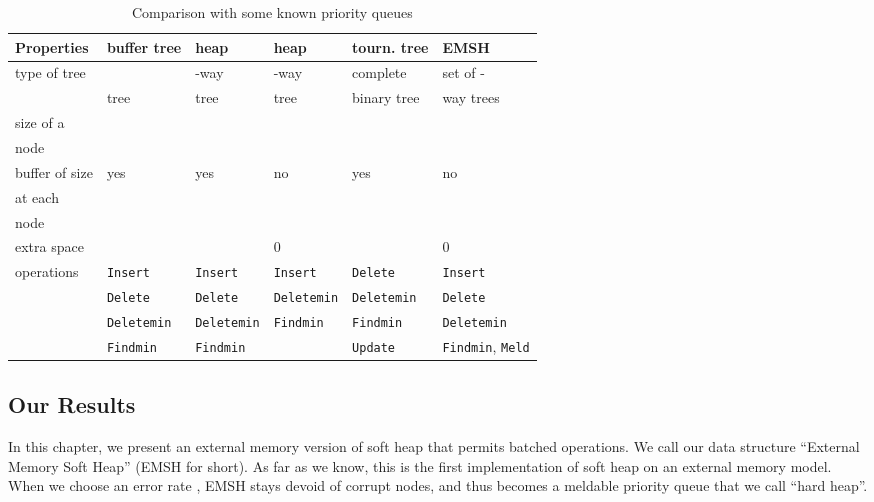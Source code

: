 \begin{table}
\begin{center}
            \begin{tabular}{|l|l|l|l|l|l|}
\cline{1-6}
               \hline
{\bf Properties}  &   {\bf buffer tree}     & {\bf heap} \cite{KS96}      & {\bf heap} \cite{FJKT99}    & {\bf tourn. tree}
   & {\bf EMSH} \\
\hline \hline
type of tree &     & -way & -way & complete & set of
                                                                      - \\
             &  tree        & tree           & tree    & binary tree & way trees \\
\hline
size of a     &               &   &         &     &  \\
node          &                  &                &          &        &        \\
\hline
buffer of size &    yes          &   yes          & no       & yes    & no  \\
 at each    &                 &                &          &        &   \\
node            &                 &                &          &        &   \\
\hline
extra space    &      &   & 0   &  & 0 \\
\hline
operations     & {\tt Insert} & {\tt Insert}    & {\tt Insert}    & {\tt Delete}    & {\tt Insert} \\
               & {\tt Delete} & {\tt Delete}    & {\tt Deletemin} & {\tt Deletemin} & {\tt Delete} \\
            & {\tt Deletemin} & {\tt Deletemin} & {\tt Findmin}   & {\tt Findmin}   & {\tt Deletemin} \\
            & {\tt Findmin}   & {\tt Findmin}   &                 & {\tt Update}& {\tt Findmin}, {\tt Meld} \\
\hline
\end{tabular}
\caption{Comparison with some known priority queues }
\label{comparison:emsh}
\end{center}
\end{table}
\subsection{Our Results}
In this chapter, we present an external memory version of soft heap that permits
batched operations. We call our data structure ``External Memory Soft Heap''
(EMSH for short). 
As far as we know, this is the first implementation of soft heap
on an external memory model. 
When we choose an error rate , EMSH stays devoid of corrupt nodes, 
and thus becomes a meldable priority queue that we call ``hard heap''.  


